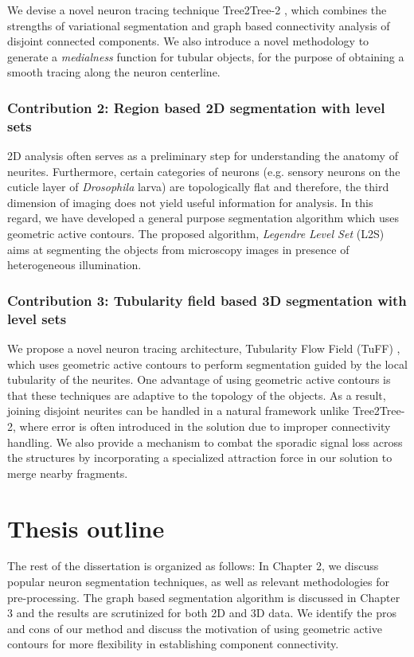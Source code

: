 We devise a novel neuron tracing technique Tree2Tree-2 \cite{mukherjee_T2T_2}, which combines the strengths of variational segmentation and graph based connectivity analysis of disjoint connected components. We also introduce a novel methodology to generate a \textit{medialness} function \cite{mukherjee_medialness} for tubular objects, for the purpose of obtaining a smooth tracing along the neuron centerline.

\subsubsection*{Contribution 2: Region based 2D segmentation with level sets}
2D analysis often serves as a preliminary step for understanding the anatomy of neurites. Furthermore, certain categories of neurons (e.g. sensory neurons on the cuticle layer of \textit{Drosophila} larva) are topologically flat and therefore, the third dimension of imaging does not yield useful information for analysis. In this regard, we have developed a general purpose segmentation algorithm which uses geometric active contours. The proposed algorithm, \textit{Legendre Level Set} (L2S)\cite{mukherjee_L2S} aims at segmenting the objects from microscopy images in presence of heterogeneous illumination. 

\subsubsection*{Contribution 3: Tubularity field based 3D segmentation with level sets}
We propose a novel neuron tracing architecture, Tubularity Flow Field (TuFF) \cite{mukherjee_TuFF}, which uses geometric active contours to perform segmentation guided by the local tubularity of the neurites. One advantage of using geometric active contours is that these techniques are adaptive to the topology of the objects. As a result, joining disjoint neurites can be handled in a natural framework unlike Tree2Tree-2, where error is often introduced in the solution due to improper connectivity handling. We also provide a mechanism to combat the sporadic signal loss across the structures by incorporating a specialized attraction force in our solution to merge nearby fragments. 

\section{Thesis outline}
The rest of the dissertation is organized as follows: In Chapter 2, we discuss popular neuron segmentation techniques, as well as relevant methodologies for pre-processing.  
The graph based segmentation algorithm is discussed in Chapter 3 and the results are scrutinized for both 2D and 3D data. We identify the pros and cons of our method and discuss the motivation of using geometric active contours for more flexibility in establishing component connectivity. 

